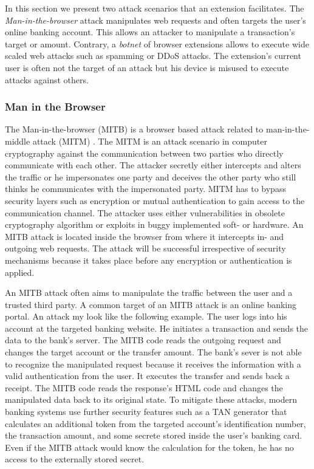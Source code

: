 	In this section we present two attack scenarios that an extension facilitates. The \textit{Man-in-the-browser} attack manipulates web requests and often targets the user's online banking account. This allows an attacker to manipulate a transaction's target or amount. Contrary, a \textit{botnet} of browser extensions allows to execute wide scaled web attacks such as spamming or DDoS attacks. The extension's current user is often not the target of an attack but his device is misused to execute attacks against others.

\subsubsection{Man in the Browser}
	
	The Man-in-the-browser (MITB) is a browser based attack related to man-in-the-middle attack (MITM) \cite{Curran:2012:MBA:2433195.2433198}. The MITM is an attack scenario in computer cryptography against the communication between two parties who directly communicate with each other. The attacker secretly either intercepts and alters the traffic or he impersonates one party and deceives the other party who still thinks he communicates with the impersonated party. MITM has to bypass security layers such as encryption or mutual authentication to gain access to the communication channel. The attacker uses either vulnerabilities in obsolete cryptography algorithm or exploits in buggy implemented soft- or hardware. An MITB attack is located inside the browser from where it intercepts in- and outgoing web requests. The attack will be successful irrespective of security mechanisms because it takes place before any encryption or authentication is applied. 
	
	An MITB attack often aims to manipulate the traffic between the user and a trusted third party. A common target of an MITB attack is an online banking portal. An attack my look like the following example. The user logs into his account at the targeted banking website. He initiates a transaction and sends the data to the bank's server. The MITB code reads the outgoing request and changes the target account or the transfer amount. The bank's sever is not able to recognize the manipulated request because it receives the information with a valid authentication from the user. It executes the transfer and sends back a receipt. The MITB code reads the response's HTML code and changes the manipulated data back to its original state. To mitigate these attacks, modern banking systems use further security features such as a TAN generator that calculates an additional token from the targeted account's identification number, the transaction amount, and some secrete stored inside the user's banking card. Even if the MITB attack would know the calculation for the token, he has no access to the externally stored secret.
	 
